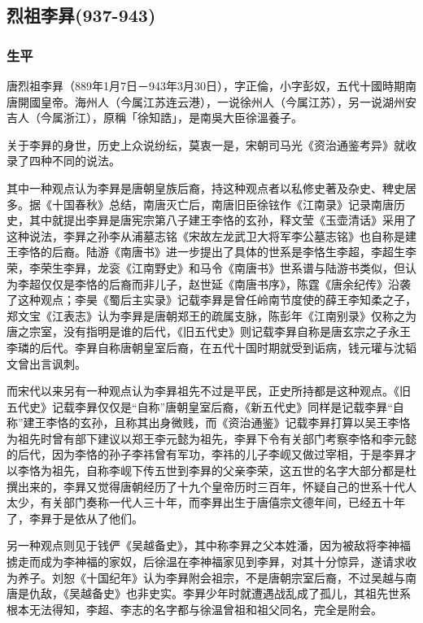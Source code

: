 
\subsection{烈祖李昪\tiny(937-943)}

\subsubsection{生平}

唐烈祖李昪（889年1月7日－943年3月30日），字正倫，小字彭奴，五代十國時期南唐開國皇帝。海州人（今属江苏连云港），一说徐州人（今属江苏），另一说湖州安吉人（今属浙江），原稱「徐知誥」，是南吳大臣徐溫養子。

关于李昪的身世，历史上众说纷纭，莫衷一是，宋朝司马光《资治通鉴考异》就收录了四种不同的说法。

其中一种观点认为李昪是唐朝皇族后裔，持这种观点者以私修史著及杂史、稗史居多。据《十国春秋》总结，南唐灭亡后，南唐旧臣徐铉作《江南录》记录南唐历史，其中就提出李昪是唐宪宗第八子建王李恪的玄孙，释文莹《玉壶清话》采用了这种说法，李昪之孙李从浦墓志铭《宋故左龙武卫大将军李公墓志铭》也自称是建王李恪的后裔。陆游《南唐书》进一步提出了具体的世系是李恪生李超，李超生李荣，李荣生李昪，龙衮《江南野史》和马令《南唐书》世系谱与陆游书类似，但认为李超仅仅是李恪的后裔而非儿子，赵世延《南唐书序》，陈霆《唐余纪传》沿袭了这种观点；李昊《蜀后主实录》记载李昪是曾任岭南节度使的薛王李知柔之子，郑文宝《江表志》认为李昪是唐朝郑王的疏属支脉，陈彭年《江南别录》仅称之为唐之宗室，没有指明是谁的后代，《旧五代史》则记载李昪自称是唐玄宗之子永王李璘的后代。李昪自称唐朝皇室后裔，在五代十国时期就受到诟病，钱元瓘与沈韬文曾出言讽刺。

而宋代以来另有一种观点认为李昪祖先不过是平民，正史所持都是这种观点。《旧五代史》记载李昪仅仅是“自称”唐朝皇室后裔，《新五代史》同样是记载李昪“自称”建王李恪的玄孙，且称其出身微贱，而《资治通鉴》记载李昪打算以吴王李恪为祖先时曾有部下建议以郑王李元懿为祖先，李昪下令有关部门考察李恪和李元懿的后代，因为李恪的孙子李祎曾有军功，李祎的儿子李岘又做过宰相，于是李昪才以李恪为祖先，自称李岘下传五世到李昪的父亲李荣，这五世的名字大部分都是杜撰出来的，李昪又觉得唐朝经历了十九个皇帝历时三百年，怀疑自己的世系十代人太少，有关部门奏称一代人三十年，而李昪出生于唐僖宗文德年间，已经五十年了，李昪于是依从了他们。

另一种观点则见于钱俨《吴越备史》，其中称李昪之父本姓潘，因为被敌将李神福掳走而成为李神福的家奴，后徐温在李神福家见到李昪，对其十分惊异，遂请求收为养子。刘恕《十国纪年》认为李昪附会祖宗，不是唐朝宗室后裔，不过吴越与南唐是仇敌，《吴越备史》也非史实。李昪少年时就遭遇战乱成了孤儿，其祖先世系根本无法得知，李超、李志的名字都与徐温曾祖和祖父同名，完全是附会。

